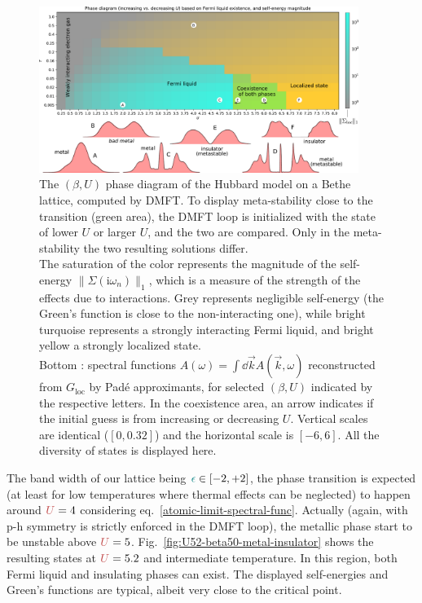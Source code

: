 \documentclass[reprint,amsmath,amssymb,aps,pra]{revtex4-2}
\newcommand{\iwn}{\mathrm{i}\omega_n}
\begin{document}
\begin{figure}[H]
\includegraphics[width=0.925\textwidth]{phase-diagram-composition.pdf}
\centering
\caption{\label{fig:phase-diagram}The $(\beta,U)$ phase diagram of the Hubbard model on a Bethe lattice, computed by DMFT. To display meta-stability close to the transition (green area), the DMFT loop is initialized with the state of lower $U$ or larger $U$, and the two are compared. Only in the meta-stability the two resulting solutions differ.\\ The saturation of the color represents the magnitude of the self-energy $\|\Sigma(\iwn)\|_1$, which is a measure of the strength of the effects due to interactions. Grey represents negligible self-energy (the Green's function is close to the non-interacting one), while bright turquoise represents a strongly interacting Fermi liquid, and bright yellow a strongly localized state.\\Bottom : spectral functions $A(\omega)=\int\dd{\vec{k}} A(\vec{k},\omega)$ reconstructed from $G_\text{loc}$ by Padé approximants, for selected $(\beta,U)$ indicated by the respective letters. In the coexistence area, an arrow indicates if the initial guess is from increasing or decreasing $U$. Vertical scales are identical ($[0,0.32]$) and the horizontal scale is $[-6,6]$. All the diversity of states is displayed here.}
\end{figure}

\twocolumngrid

The band width of our lattice being ${\color[HTML]{008080}\epsilon} \in [-2,+2]$, the phase transition is expected (at least for low temperatures where thermal effects can be neglected) to happen around ${\color[HTML]{BF4040}U}=4$ considering eq.~\eqref{atomic-limit-spectral-func}. Actually (again, with p-h symmetry is strictly enforced in the DMFT loop), the metallic phase start to be unstable above ${\color[HTML]{BF4040}U}=5$. Fig.~\ref{fig:U52-beta50-metal-insulator} shows the resulting states at ${\color[HTML]{BF4040}U}=5.2$ and intermediate temperature. In this region, both Fermi liquid and insulating phases can exist. The displayed self-energies and Green's functions are typical, albeit very close to the critical point.
\end{document}

